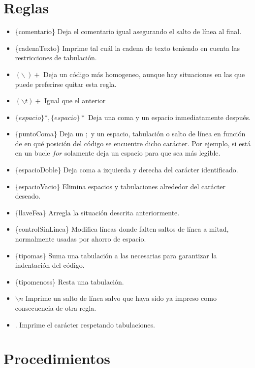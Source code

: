\documentclass[11pt,spanish]{article} %
\begin{document}
\section{Reglas}
\begin{itemize}
	\item \{comentario\} Deja el comentario igual asegurando el salto de línea al final.
	\item \{cadenaTexto\} Imprime tal cuál la cadena de texto teniendo en cuenta las restricciones de tabulación.
	\item $(\backslash \ )+$ Deja un código más homogeneo, aunque hay situaciones en las que puede preferirse quitar esta regla.
	\item $(\backslash t)+$ Igual que el anterior
	\item $\{espacio\}*,\{espacio\}*$ Deja una coma y un espacio inmediatamente después.
	\item \{puntoComa\} Deja un $;$ y un espacio, tabulación o salto de línea en función de en qué posición del código se encuentre dicho carácter. Por ejemplo, si está en un bucle $for$ solamente deja un espacio para que sea más legible.
	\item \{espacioDoble\} Deja coma a izquierda y derecha del carácter identificado.
	\item \{espacioVacio\} Elimina espacios y tabulaciones alrededor del carácter deseado.
	\item \{llaveFea\} Arregla la situación descrita anteriormente.
	\item \{controlSinLinea\} Modifica líneas donde falten saltos de línea a mitad, normalmente usadas por ahorro de espacio.
	\item \{tipomas\} Suma una tabulación a las necesarias para garantizar la indentación del código.
	\item \{tipomenoss\} Resta una tabulación.
	\item $\backslash n$ Imprime un salto de línea salvo que haya sido ya impreso como consecuencia de otra regla.
	\item .	Imprime el carácter respetando tabulaciones.
\end{itemize}



\section{Procedimientos}



\end{document}
